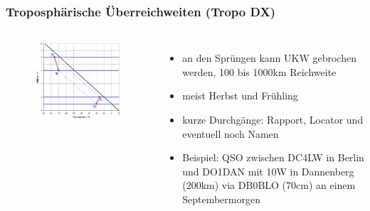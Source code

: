 \begin{frame}
  \frametitle{Troposphärische Überreichweiten (Tropo DX)}

  \begin{columns}
      \begin{center}
        \begin{figure}
          \includegraphics[width=\textwidth,height=.8\textheight,keepaspectratio]{bv11/Absinkinversion.png}
        \end{figure}
      \end{center}
      \begin{itemize}
        \item an den Sprüngen kann UKW gebrochen werden, 100 bis 1000km Reichweite
        \item meist Herbst und Frühling
        \item kurze Durchgänge: Rapport, Locator und eventuell noch Namen
        \item Beispiel: QSO zwischen DC4LW in Berlin und DO1DAN mit 10W in Dannenberg (200km) via DB0BLO (70cm) an einem Septembermorgen
      \end{itemize}
\end{columns}

\end{frame}

